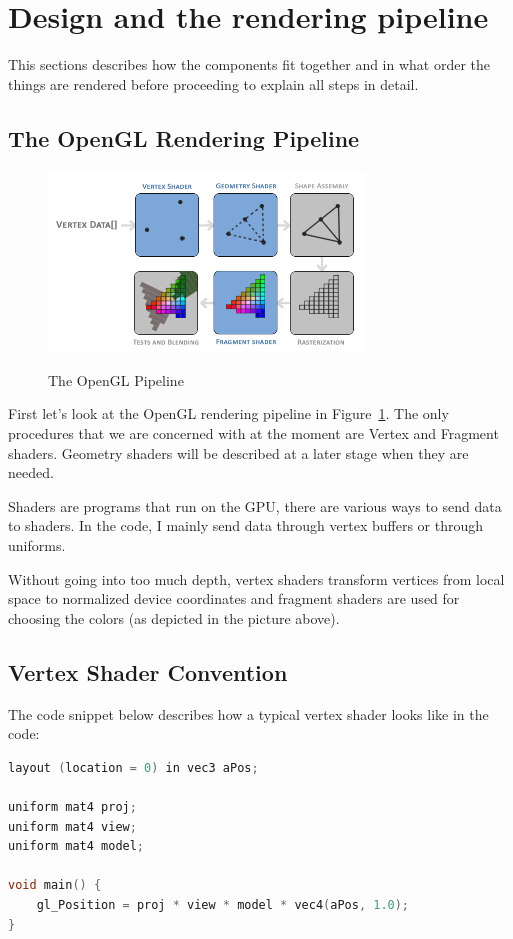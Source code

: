 \section{Design and the rendering pipeline}
This sections describes how the components fit together and in what order the things are rendered before proceeding to explain all steps in detail.

\subsection{The OpenGL Rendering Pipeline}
\begin{figure}[H]
    \centering
    \includegraphics[width=0.75\textwidth]{images/opengl_pipeline.png}
    \caption{The OpenGL Pipeline} \cite{learnopengl}
    \label{fig:opengl_pipeline}
\end{figure}

First let's look at the OpenGL rendering pipeline in Figure~\ref{fig:opengl_pipeline}. The only procedures that we are concerned with at the moment are Vertex and Fragment shaders. Geometry shaders will be described at a later stage when they are needed.

\begin{definition}[Shaders]
	Shaders are programs that run on the GPU, there are various ways to send data to shaders. In the code, I mainly send data through vertex buffers or through uniforms. 
\end{definition}

Without going into too much depth, vertex shaders transform vertices from local space to normalized device coordinates and fragment shaders are used for choosing the colors (as depicted in the picture above).

\subsection{Vertex Shader Convention}
The code snippet below describes how a typical vertex shader looks like in the code:
\begin{lstlisting}[language=C]
layout (location = 0) in vec3 aPos;

uniform mat4 proj;
uniform mat4 view;
uniform mat4 model;

void main() {
	gl_Position = proj * view * model * vec4(aPos, 1.0);
}

\end{lstlisting}

